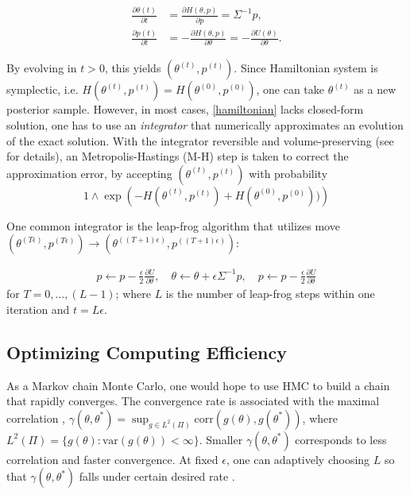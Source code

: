 \documentclass[10pt]{article}
\DeclareMathOperator{\1}{\mathbbm{1}}
\begin{document}
\begin{equation}
\begin{aligned}
\label{hamiltonian}
\frac{\partial \theta (t)}{\partial t} & =\frac{\partial H(\theta, p)}{\partial p} = \Sigma^{-1}p,\\
\frac{\partial p(t)}{\partial t}& =-\frac{\partial H(\theta, p)}{\partial \theta} = -\frac{\partial U(\theta)}{\partial \theta}.
\end{aligned}
\end{equation}

By evolving in $t>0$, this yields $(\theta^{(t)},p^{(t)})$. Since Hamiltonian system is symplectic, i.e. $H(\theta^{(t)},p^{(t)})=H(\theta^{(0)},p^{(0)})$, one can take $\theta^{(t)}$ as a new posterior sample. However, in most cases, \eqref{hamiltonian} lacks closed-form solution, one has to use an {\it integrator} that numerically approximates an evolution of the exact solution. With the integrator reversible and volume-preserving (see \citep{neal2011mcmc} for details), an Metropolis-Hastings (M-H) step is taken to correct the approximation error, by accepting $(\theta^{(t)},p^{(t)})$ with probability 
$$1\wedge \exp  \left( - H(\theta^{(t)},p^{(t)}) + H(\theta^{(0)},p^{(0)}))\right)$$

One common integrator is the leap-frog algorithm \citep{neal2011mcmc}that utilizes move $(\theta^{(T\epsilon)}, p^{(T\epsilon)}) \rightarrow (\theta^{((T+1)\epsilon)}, p^{((T+1)\epsilon)})$:

\begin{equation}
\begin{aligned}
\label{leap-frog}
p \leftarrow p - \frac{\epsilon}{2} \frac{\partial U}{\partial  \theta },\quad
 \theta \leftarrow  \theta  + \epsilon \Sigma^{-1}p,\quad
p \leftarrow p -  \frac{\epsilon}{2}  \frac{\partial U}{\partial  \theta } 
\end{aligned}
\end{equation}
for $T=0,\ldots,(L-1)$; where $L$ is the number of leap-frog steps within one iteration and $t=L\epsilon$.


\subsection{Optimizing Computing Efficiency}

As a Markov chain Monte Carlo, one would hope to use HMC to build a chain that rapidly converges. The convergence rate is associated with the maximal correlation  \citep{liu2008monte}, $\gamma (\theta,\theta^*) = \sup_{g \in L^2(\Pi)} \mbox{corr}(g(\theta), g(\theta^*))
$, where $L^2(\Pi)=\{g(\theta): \mbox{var}(g(\theta))<\infty\}$. Smaller $\gamma (\theta,\theta^*)$ corresponds to less correlation and faster convergence. At fixed $\epsilon$, one can adaptively choosing $L$ so that $\gamma (\theta,\theta^*)$ falls under certain desired rate \citep{hoffman2014no}.
\end{document}
